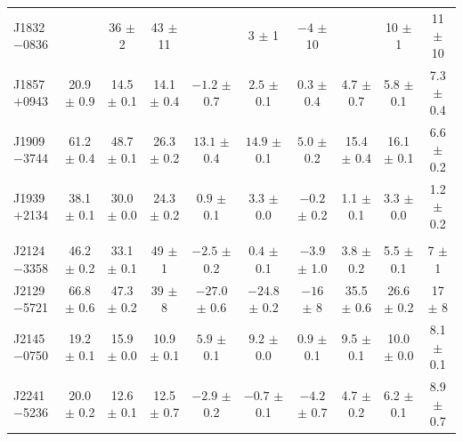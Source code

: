 \documentclass[useAMS,usenatbib]{mn2e}
\begin{document}
\begin{table}
\begin{center}
\begin{tabular}{lccccccccc}
J1832$-$0836&               & 36   $\pm $ 2  & 43   $\pm$ 11 &                  &$   3 $ $\pm$ 1   &$   -4$ $\pm$ 10  &                &   10 $\pm$ 1   & 11   $\pm$ 10   \\
J1857$+$0943& 20.9 $\pm$ 0.9& 14.5 $\pm $ 0.1& 14.1 $\pm$ 0.4&$ -1.2$ $\pm$ 0.7 &$  2.5$ $\pm$ 0.1 &$  0.3$ $\pm$ 0.4 &  4.7 $\pm$ 0.7 &  5.8 $\pm$ 0.1 & 7.3  $\pm$ 0.4 \\
J1909$-$3744& 61.2 $\pm$ 0.4& 48.7 $\pm $ 0.1& 26.3 $\pm$ 0.2&$ 13.1$ $\pm$ 0.4 &$ 14.9$ $\pm$ 0.1 &$  5.0$ $\pm$ 0.2 & 15.4 $\pm$ 0.4 & 16.1 $\pm$ 0.1 & 6.6  $\pm$ 0.2 \\
J1939$+$2134& 38.1 $\pm$ 0.1& 30.0 $\pm $ 0.0& 24.3 $\pm$ 0.2&$ 0.9 $ $\pm$ 0.1 &$  3.3$ $\pm$ 0.0 &$ -0.2$ $\pm$ 0.2 &  1.1 $\pm$ 0.1 &  3.3 $\pm$ 0.0 & 1.2  $\pm$ 0.2 \\
            &               &                &               &                  &                  &                  &                &                &               \\
J2124$-$3358& 46.2 $\pm$ 0.2& 33.1 $\pm $ 0.1& 49   $\pm$ 1  &$ -2.5$ $\pm$ 0.2 &$  0.4$ $\pm$ 0.1 &$ -3.9$ $\pm$ 1.0 &  3.8 $\pm$ 0.2 &  5.5 $\pm$ 0.1 & 7    $\pm$ 1   \\
J2129$-$5721& 66.8 $\pm$ 0.6& 47.3 $\pm $ 0.2& 39   $\pm$ 8  &$-27.0$ $\pm$ 0.6 &$-24.8$ $\pm$ 0.2 &$ -16 $ $\pm$ 8   & 35.5 $\pm$ 0.6 & 26.6 $\pm$ 0.2 & 17   $\pm$ 8  \\
J2145$-$0750& 19.2 $\pm$ 0.1& 15.9 $\pm $ 0.0& 10.9 $\pm$ 0.1&$  5.9$ $\pm$ 0.1 &$  9.2$ $\pm$ 0.0 &$  0.9$ $\pm$ 0.1 &  9.5 $\pm$ 0.1 & 10.0 $\pm$ 0.0 & 8.1  $\pm$ 0.1 \\
J2241$-$5236& 20.0 $\pm$ 0.2& 12.6 $\pm $ 0.1& 12.5 $\pm$ 0.7&$ -2.9$ $\pm$ 0.2 &$ -0.7$ $\pm$ 0.1 &$ -4.2$ $\pm$ 0.7 &  4.7 $\pm$ 0.2 &  6.2 $\pm$ 0.1 & 8.9  $\pm$ 0.7 \\
\hline
\end{tabular}
\end{center}
\end{table}
\end{document}
